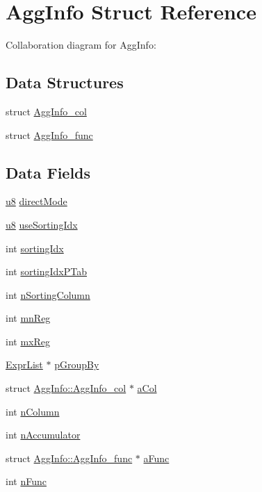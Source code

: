 \hypertarget{struct_agg_info}{}\section{Agg\+Info Struct Reference}
\label{struct_agg_info}


Collaboration diagram for Agg\+Info\+:
\subsection*{Data Structures}
\begin{DoxyCompactItemize}
\item 
struct \hyperlink{struct_agg_info_1_1_agg_info__col}{Agg\+Info\+\_\+col}
\item 
struct \hyperlink{struct_agg_info_1_1_agg_info__func}{Agg\+Info\+\_\+func}
\end{DoxyCompactItemize}
\subsection*{Data Fields}
\begin{DoxyCompactItemize}
\item 
\hyperlink{sqlite3_8c_a74a0f6424ae628af25f23f0a35f6ead3}{u8} \hyperlink{struct_agg_info_a4fe79eb06ac8891c5853432b666cd391}{direct\+Mode}
\item 
\hyperlink{sqlite3_8c_a74a0f6424ae628af25f23f0a35f6ead3}{u8} \hyperlink{struct_agg_info_a391d05aacd406e0a61ac222d31d41634}{use\+Sorting\+Idx}
\item 
int \hyperlink{struct_agg_info_ac9628ba6d40fe1a8afe480fc7e7cb3f6}{sorting\+Idx}
\item 
int \hyperlink{struct_agg_info_a7bfac432926e3f589e8527c7f7d9bff1}{sorting\+Idx\+P\+Tab}
\item 
int \hyperlink{struct_agg_info_ab28e40461501c58ce019de060fb5d35f}{n\+Sorting\+Column}
\item 
int \hyperlink{struct_agg_info_a7d38211c9089736ee411532f28dfb2e1}{mn\+Reg}
\item 
int \hyperlink{struct_agg_info_aef604a80ab7d118d0a845d1e2e2ad07f}{mx\+Reg}
\item 
\hyperlink{struct_expr_list}{Expr\+List} $\ast$ \hyperlink{struct_agg_info_ab73f489b26450bf7c199d78c93092cea}{p\+Group\+By}
\item 
struct \hyperlink{struct_agg_info_1_1_agg_info__col}{Agg\+Info\+::\+Agg\+Info\+\_\+col} $\ast$ \hyperlink{struct_agg_info_a8d83a14b89f4fde9637b547388ceb262}{a\+Col}
\item 
int \hyperlink{struct_agg_info_a7234b16e113cc77e0d6720214ff35508}{n\+Column}
\item 
int \hyperlink{struct_agg_info_a25984684dced6d2dd6b199ba9d313874}{n\+Accumulator}
\item 
struct \hyperlink{struct_agg_info_1_1_agg_info__func}{Agg\+Info\+::\+Agg\+Info\+\_\+func} $\ast$ \hyperlink{struct_agg_info_a68dec2e02db37fc00b6ab1627e82d0e0}{a\+Func}
\item 
int \hyperlink{struct_agg_info_a1a96e533b0a914bddce66c2e19fedcb4}{n\+Func}
\end{DoxyCompactItemize}


